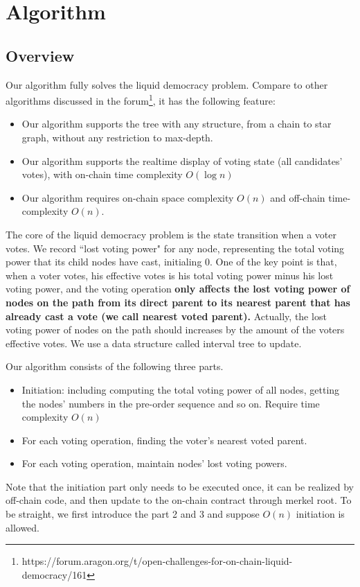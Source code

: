 \section{Algorithm}
\subsection{Overview}
Our algorithm fully solves the liquid democracy problem. Compare to other algorithms discussed in the forum\footnote{https://forum.aragon.org/t/open-challenges-for-on-chain-liquid-democracy/161}, it has the following feature:
\begin{itemize}
	\item Our algorithm supports the tree with any structure, from a chain to star graph, without any restriction to max-depth.
	\item Our algorithm supports the realtime display of voting state (all candidates' votes), with on-chain time complexity $O(\log n)$
	\item Our algorithm requires on-chain space complexity $O(n)$ and off-chain time-complexity $O(n)$.
\end{itemize}
The core of the liquid democracy problem is the state transition when a voter votes. We record ``lost voting power" for any node, representing the total voting power that its child nodes have cast, initialing 0.  One of the key point is that, when a voter votes, his effective votes is his total voting power minus his lost voting power, and the voting operation \textbf{only affects the lost voting power of nodes on the path from its direct parent to its nearest parent that has already cast a vote (we call nearest voted parent).} Actually, the lost voting power of nodes on the path should increases by the amount of the voters effective votes. We use a data structure called interval tree to update.

Our algorithm consists of the following three parts.
\begin{itemize}
	\item Initiation: including computing the total voting power of all nodes, getting the nodes' numbers in the pre-order sequence and so on. Require time complexity $O(n)$
	\item For each voting operation, finding the voter's nearest voted parent.
	\item For each voting operation, maintain nodes' lost voting powers.
\end{itemize}

Note that the initiation part only needs to be executed once, it can be realized by off-chain code, and then update to the on-chain contract through merkel root. To be straight, we first introduce the part 2 and 3 and suppose $O(n)$ initiation is allowed.

